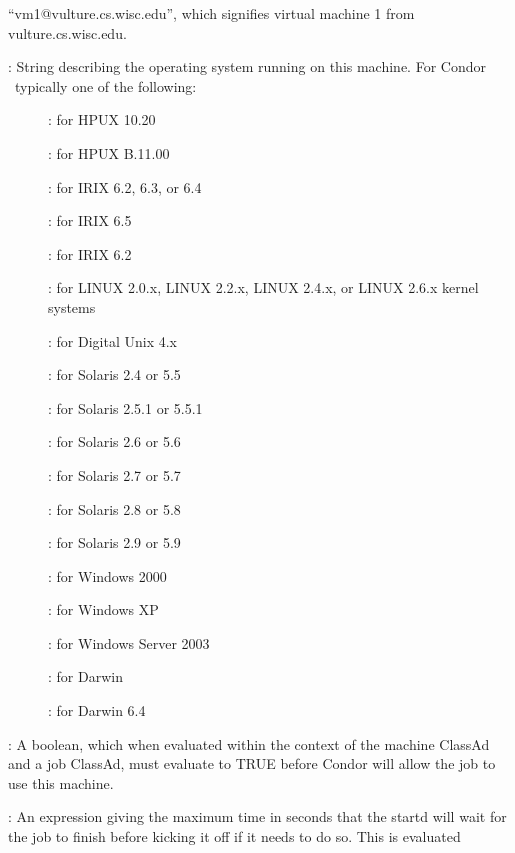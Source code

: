 \begin{description}
``vm1@vulture.cs.wisc.edu'', which signifies virtual machine 1 from
vulture.cs.wisc.edu. 
%
\item[\AdAttr{OpSys}] : String describing the operating system running on this
machine.  For Condor \VersionNotice\ typically one of the following:
	\begin{description}
	\item[] : for HPUX 10.20
	\item[] : for HPUX B.11.00
	\item[] : for IRIX 6.2, 6.3, or 6.4
	\item[] : for IRIX 6.5
	\item[] : for IRIX 6.2
	\item[] : for LINUX 2.0.x, LINUX 2.2.x,
	LINUX 2.4.x, or LINUX 2.6.x kernel systems
	\item[] : for Digital Unix 4.x
	\item[] : for Solaris 2.4 or 5.5
	\item[] : for Solaris 2.5.1 or 5.5.1
	\item[] : for Solaris 2.6 or 5.6
	\item[] : for Solaris 2.7 or 5.7
	\item[] : for Solaris 2.8 or 5.8
	\item[] : for Solaris 2.9 or 5.9
	\item[] : for Windows 2000
	\item[] : for Windows XP
	\item[] : for Windows Server 2003
	\item[] : for Darwin
	\item[] : for Darwin 6.4
	\end{description}
%
\item[\AdAttr{Requirements}] : A boolean, which when evaluated within the context
of the machine ClassAd and a job ClassAd, must evaluate to
TRUE before Condor will allow the job to use this machine.
%
\item[\AdAttr{MaxJobRetirementTime}] : An expression giving the
maximum time in seconds that the startd will wait for the job to
finish before kicking it off if it needs to do so.  This is evaluated

\end{description}
